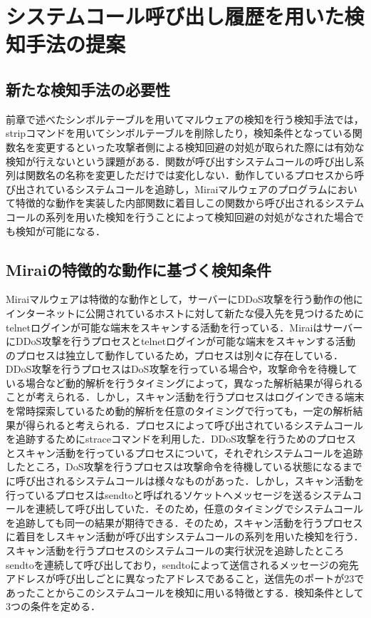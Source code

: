 \chapter{システムコール呼び出し履歴を用いた検知手法の提案}

\section{新たな検知手法の必要性}
前章で述べたシンボルテーブルを用いてマルウェアの検知を行う検知手法では，stripコマンドを用いてシンボルテーブルを削除したり，検知条件となっている関数名を変更するといった攻撃者側による検知回避の対処が取られた際には有効な検知が行えないという課題がある．関数が呼び出すシステムコールの呼び出し系列は関数名の名称を変更しただけでは変化しない．動作しているプロセスから呼び出されているシステムコールを追跡し，Miraiマルウェアのプログラムにおいて特徴的な動作を実装した内部関数に着目しこの関数から呼び出されるシステムコールの系列を用いた検知を行うことによって検知回避の対処がなされた場合でも検知が可能になる．


\section{Miraiの特徴的な動作に基づく検知条件}
Miraiマルウェアは特徴的な動作として，サーバーにDDoS攻撃を行う動作の他にインターネットに公開されているホストに対して新たな侵入先を見つけるためにtelnetログインが可能な端末をスキャンする活動を行っている．MiraiはサーバーにDDoS攻撃を行うプロセスとtelnetログインが可能な端末をスキャンする活動のプロセスは独立して動作しているため，プロセスは別々に存在している．DDoS攻撃を行うプロセスはDoS攻撃を行っている場合や，攻撃命令を待機している場合など動的解析を行うタイミングによって，異なった解析結果が得られることが考えられる．しかし，スキャン活動を行うプロセスはログインできる端末を常時探索しているため動的解析を任意のタイミングで行っても，一定の解析結果が得られると考えられる．プロセスによって呼び出されているシステムコールを追跡するためにstraceコマンドを利用した．DDoS攻撃を行うためのプロセスとスキャン活動を行っているプロセスについて，それぞれシステムコールを追跡したところ，DoS攻撃を行うプロセスは攻撃命令を待機している状態になるまでに呼び出されるシステムコールは様々なものがあった．しかし，スキャン活動を行っているプロセスはsendtoと呼ばれるソケットへメッセージを送るシステムコールを連続して呼び出していた．そのため，任意のタイミングでシステムコールを追跡しても同一の結果が期待できる．そのため，スキャン活動を行うプロセスに着目をしスキャン活動が呼び出すシステムコールの系列を用いた検知を行う．スキャン活動を行うプロセスのシステムコールの実行状況を追跡したところsendtoを連続して呼び出しており，sendtoによって送信されるメッセージの宛先アドレスが呼び出しごとに異なったアドレスであること，送信先のポートが23であったことからこのシステムコールを検知に用いる特徴とする．検知条件として3つの条件を定める．

